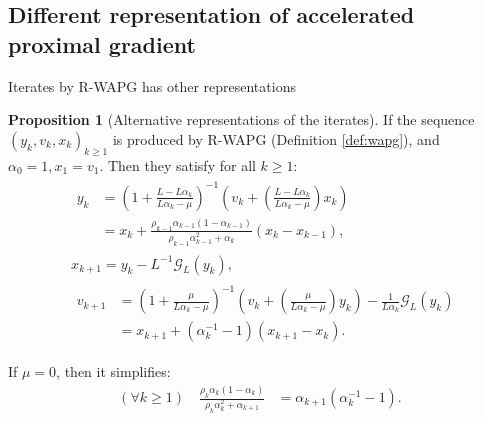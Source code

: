 \documentclass[11pt]{beamer}
\theoremstyle{definition}
\newtheorem{proposition}{Proposition}[section]
\begin{document}
    \subsection{Different representation of accelerated proximal gradient}
        \begin{frame}{Iterates by R-WAPG has other representations}
            \begin{proposition}[Alternative representations of the iterates]\label{prop:wapg-first-equivalent-repr}
                If the sequence $(y_k, v_k, x_k)_{k \ge 1}$ is produced by R-WAPG (Definition \ref{def:wapg}), and $\alpha_0 = 1, x_1 = v_1$. 
                Then they satisfy for all $k\ge 1$: 
                {\footnotesize
                \begin{align}
                    & \begin{aligned}
                        y_{k} &=
                        \left(
                            1 + \frac{L - L\alpha_{k}}{L\alpha_{k} - \mu}
                        \right)^{-1}
                        \left(
                            v_{k} +
                            \left(\frac{L - L\alpha_{k}}{L\alpha_{k} - \mu} \right) x_{k}
                        \right)
                        \\
                        &= x_{k} +
                        \frac{\rho_{k - 1}\alpha_{k - 1}(1 - \alpha_{k - 1})}
                        {\rho_{k - 1}\alpha_{k - 1}^2 + \alpha_{k}}(x_{k} - x_{k - 1}), 
                    \end{aligned}
                    \\
                    & x_{k + 1} =
                    y_k - L^{-1} \mathcal G_L (y_k),
                    \\
                    & \begin{aligned}
                        v_{k + 1} 
                        &=
                        \left(
                            1 + \frac{\mu}{L \alpha_k - \mu}
                        \right)^{-1}
                        \left(
                            v_k +
                            \left(\frac{\mu}{L \alpha_k - \mu}\right) y_k
                        \right) - \frac{1}{L\alpha_{k}}\mathcal G_L (y_k)
                        \\
                        &= 
                        x_{k + 1} + (\alpha_k^{-1} - 1)(x_{k + 1} - x_k).
                    \end{aligned}
                \end{align}
                }
            \end{proposition}
            If $\mu = 0$, then it simplifies:
            {\small
            \begin{align*}
                (\forall k \ge 1) \quad
                \frac{\rho_k\alpha_k(1 - \alpha_k)}{\rho_k\alpha_k^2 + \alpha_{k + 1}}
                & = \alpha_{k + 1}(\alpha_k^{-1} - 1).
            \end{align*}
            }
        \end{frame}
\end{document}
